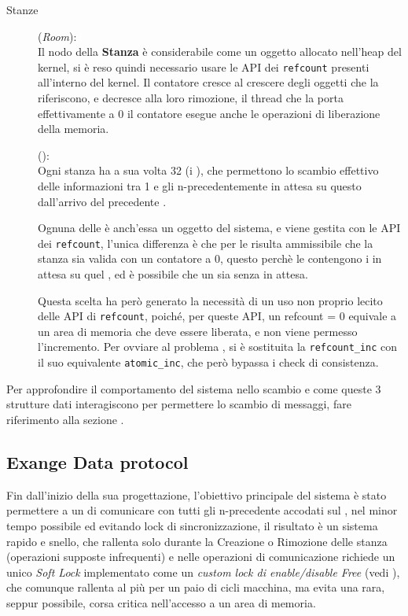 \begin{description}
\item[Stanze] (\textit{Room}):\\
Il nodo della \textbf{Stanza} è considerabile come un oggetto allocato nell'heap del kernel, si è reso
quindi necessario usare le API dei \texttt{refcount} presenti all'interno del kernel. Il contatore cresce al
crescere degli oggetti che la riferiscono, e decresce alla loro rimozione, il thread che la porta
effettivamente a 0 il contatore esegue anche le operazioni di liberazione della memoria.

\item[\Topic] (\exangeRoom):\\
Ogni stanza ha a sua volta 32 \exangeRoom (i \Topic), che permettono lo scambio effettivo delle informazioni
tra 1 \Writer e gli n-\Reader precedentemente in attesa su questo \Topic dall'arrivo del precedente \Writer.

Ognuna delle \exangeRoom è anch'essa un oggetto del sistema, e viene gestita con le API dei \texttt{refcount},
l'unica differenza è che per le \exangeRoom risulta ammissibile che la stanza sia valida con un contatore a 0,
questo perchè le \exangeRoom contengono i \Reader in attesa su quel \Topic, ed è possibile che un \Topic sia
senza \Reader in attesa.

Questa scelta ha però generato la necessità di un uso non proprio lecito delle API di \texttt{refcount},
poiché, per queste API, un refcount = 0 equivale a un area di memoria che deve essere liberata, e non viene permesso
l'incremento. Per ovviare al problema , si è sostituita la \verb|refcount_inc| con il suo equivalente
\verb|atomic_inc|, che però bypassa i check di consistenza.
\end{description}

\begin{footnotesize}
Per approfondire il comportamento del sistema nello scambio e come queste 3 strutture dati interagiscono per permettere
lo scambio di messaggi, fare riferimento alla sezione .
\end{footnotesize}

\newpage

\subsection{Exange Data protocol} \label{exangeDataProtocol}

Fin dall'inizio della sua progettazione, l'obiettivo principale del sistema è stato permettere a un \Writer di
comunicare con tutti gli n-\Reader precedente accodati sul \Topic, nel minor tempo possibile ed evitando lock
di sincronizzazione, il risultato è un sistema rapido e snello, che rallenta solo durante la Creazione o Rimozione
delle stanza (operazioni supposte infrequenti) e nelle operazioni di comunicazione richiede un unico \textit{Soft Lock}
implementato come un \textit{custom lock di enable/disable Free} (vedi ), che comunque
rallenta al più per un paio di cicli macchina, ma evita una rara, seppur possibile, corsa critica nell'accesso a un area
di memoria.

